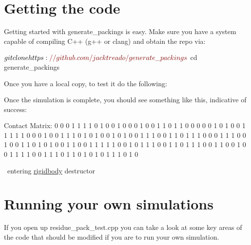 \hypertarget{index_getting_code}{}\section{Getting the code}\label{index_getting_code}
Getting started with generate\+\_\+packings is easy. Make sure you have a system capable of compiling C++ (g++ or clang) and obtain the repo via\+: 
\begin{DoxyCode}
$ git clone https:\textcolor{comment}{//github.com/jacktreado/generate\_packings}
$ cd generate\_packings
\end{DoxyCode}
 Once you have a local copy, to test it do the following\+:




Once the simulation is complete, you should see something like this, indicative of success\+:


\begin{DoxyCode}
Contact Matrix:
     0     0     0     1     1     1     1     0     1     0     0     1
     0     0     0     1     0     0     1     1     0     1     1     0
     0     0     0     0     1     0     1     0     0     1     1     1
     1     1     0     0     0     1     0     0     1     1     1     0
     1     0     1     0     0     1     0     1     0     0     1     1
     1     0     0     1     1     0     1     1     1     0     0     0
     1     1     1     0     0     1     0     0     1     1     0     1
     0     1     0     0     1     1     0     0     1     1     1     1
     1     0     0     1     0     1     1     1     0     0     1     1
     0     1     1     1     0     0     1     1     0     0     1     0
     0     1     1     1     1     0     0     1     1     1     0     1
     1     0     1     0     1     0     1     1     1     0     1     0


~entering \mbox{\hyperlink{classrigidbody}{rigidbody}} destructor
\end{DoxyCode}
\hypertarget{index_writing_sims}{}\section{Running your own simulations}\label{index_writing_sims}
If you open up {\ttfamily residue\+\_\+pack\+\_\+test.\+cpp} you can take a look at some key areas of the code that should be modified if you are to run your own simulation.

